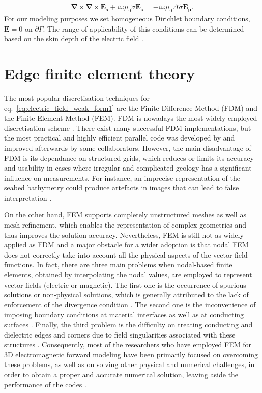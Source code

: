 \documentclass[review]{elsarticle}
\begin{document}
\begin{align}
\boldsymbol{\nabla} \times \boldsymbol{\nabla} \times \mathbf{E_{s}} + i \omega \mu_{0} \tilde{\sigma} \mathbf{E_{s}} = -i \omega \mu_{0} \Delta \tilde{\sigma} \mathbf{E_{p}.}
\label{eq:electric_field_weak_form3}
\end{align}
For our modeling purposes we set homogeneous Dirichlet boundary conditions, $\mathbf E = 0$ on $\partial\Gamma$. The range of applicability of this conditions can be determined based on the skin depth of the electric field \citep{Puzyrev2013}.

\section{Edge finite element theory}
\label{Efem_theory}
The most popular discretisation techniques for eq.~\eqref{eq:electric_field_weak_form1} are the Finite Difference Method (FDM) and the Finite Element Method (FEM). FDM is nowadays the most widely employed discretisation scheme \citep[see, e.g., ][]{Alumbaugh1996,Newman2002}. There exist many successful FDM implementations, but the most practical and highly efficient parallel code was developed by \citet{Alumbaugh1996} and improved afterwards by some collaborators. However, the main disadvantage of FDM is its dependance on structured grids, which reduces or limits its accuracy and usability in cases where irregular and complicated geology has a significant influence on measurements. For instance, an imprecise representation of the seabed bathymetry could produce artefacts in images that can lead to false interpretation \citep{Koldan2013}. 

On the other hand, FEM supports completely unstructured meshes as well as mesh refinement, which enables the representation of complex geometries and thus improves the solution accuracy. Nevertheless, FEM is still not as widely applied as FDM and a major obstacle for a wider adoption is that nodal FEM does not correctly take into account all the physical aspects of the vector field functions. In fact, there are three main problems when nodal-based finite elements, obtained by interpolating the nodal values, are employed to represent vector fields (electric or magnetic). The first one is the occurrence of spurious solutions or non-physical solutions, which is generally attributed to the lack of enforcement of the divergence condition \citep{Hiptmair1999, Jin2002, Monk2003, Hiptmair2015}. The second one is the inconvenience of imposing boundary conditions at material interfaces as well as at conducting surfaces \citep{Hiptmair2015}. Finally, the third problem is the difficulty on treating conducting and dielectric edges and corners due to field singularities associated with these structures \citep{Monk2003}. Consequently, most of the researchers who have employed FEM for 3D electromagnetic forward modeling have been primarily focused on overcoming these problems, as well as on solving other physical and numerical challenges, in order to obtain a proper and accurate numerical solution, leaving aside the performance of the codes \citep{Koldan2013}.
\end{document}

